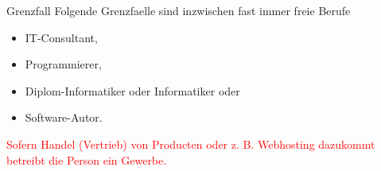 
\begin{frame}{Grenzfall}
  Folgende Grenzfaelle sind inzwischen fast immer freie Berufe
  \begin{itemize}
  \item IT-Consultant,
  \item Programmierer,
  \item Diplom-Informatiker oder Informatiker oder
  \item Software-Autor.
  \end{itemize}
  \textcolor{red}{Sofern Handel (Vertrieb) von Producten oder z. B. Webhosting dazukommt betreibt die Person ein Gewerbe.}
\end{frame}
